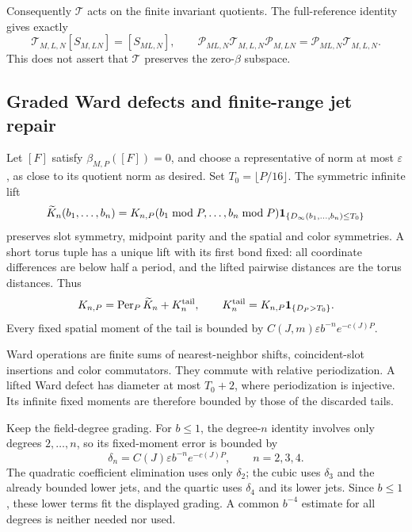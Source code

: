 \documentclass[11pt]{article}
\theoremstyle{remark}
\begin{document}
Consequently \(\mathcal T\) acts on the finite invariant
quotients. The full-reference identity gives exactly
\begin{equation}
 \mathcal T_{M,L,N}[S_{M,LN}]=[S_{ML,N}],\qquad
 \mathcal P_{ML,N}\mathcal T_{M,L,N}\mathcal P_{M,LN}
       =\mathcal P_{ML,N}\mathcal T_{M,L,N}.
 \label{fcc-telescope}
\end{equation}
This does not assert that \(\mathcal T\) preserves the
zero-\(\beta\) subspace.

\subsection{Graded Ward defects and finite-range jet repair}
\label{fcc-repair-section}

Let \([F]\) satisfy \(\beta_{M,P}([F])=0\), and choose a
representative of norm at most \(\varepsilon\), as close
to its quotient norm as desired. Set \(T_0=\lfloor P/16\rfloor\).
The symmetric infinite lift
\begin{equation}
 \widetilde K_n(b_1,\ldots,b_n)
  =K_{n,P}(b_1\bmod P,\ldots,b_n\bmod P)
           {\bf1}_{\{D_\infty(b_1,\ldots,b_n)\le T_0\}}
 \label{fcc-short-lift}
\end{equation}
preserves slot symmetry, midpoint parity and the spatial
and color symmetries. A short torus tuple has a unique
lift with its first bond fixed: all coordinate differences
are below half a period, and the lifted pairwise distances
are the torus distances. Thus
\begin{equation}
 K_{n,P}=\operatorname{Per}_P\widetilde K_n+K_n^{\rm tail},
 \qquad
 K_n^{\rm tail}=K_{n,P}{\bf1}_{\{D_P>T_0\}}.
 \label{fcc-short-tail}
\end{equation}
Every fixed spatial moment of the tail is bounded by
\(C(J,m)\varepsilon b^{-n}e^{-c(J)P}\).

Ward operations are finite sums of nearest-neighbor
shifts, coincident-slot insertions and color commutators.
They commute with relative periodization. A lifted Ward
defect has diameter at most \(T_0+2\), where periodization
is injective. Its infinite fixed moments are therefore
bounded by those of the discarded tails.

Keep the field-degree grading. For \(b\le1\), the
degree-\(n\) identity involves only degrees \(2,\ldots,n\),
so its fixed-moment error is bounded by
\begin{equation}
 \delta_n=C(J)\varepsilon b^{-n}e^{-c(J)P},
       \qquad n=2,3,4.
 \label{fcc-graded-defect}
\end{equation}
The quadratic coefficient elimination uses only
\(\delta_2\); the cubic uses \(\delta_3\) and the already
bounded lower jets, and the quartic uses \(\delta_4\)
and its lower jets. Since \(b\le1\), these lower terms
fit the displayed grading. A common \(b^{-4}\) estimate
for all degrees is neither needed nor used.
\end{document}
